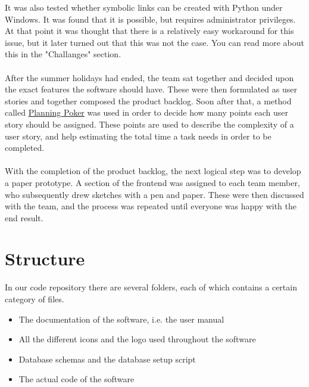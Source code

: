 It was also tested whether symbolic links can be created with Python under Windows. It was found that it is possible, but requires administrator privileges. At that point it was thought that there is a relatively easy workaround for this issue, but it later turned out that this was not the case. You can read more about this in the "Challanges" section. %

\paragraph{}
After the summer holidays had ended, the team sat together and decided upon the exact features the software should have. These were then formulated as user stories and together composed the product backlog. Soon after that, a method called \href{https://en.wikipedia.org/wiki/Planning_poker}{Planning Poker} was used in order to decide how many points each user story should be assigned. These points are used to describe the complexity of a user story, and help estimating the total time a task needs in order to be completed.

\paragraph{}
With the completion of the product backlog, the next logical step was to develop a paper prototype. A section of the frontend was assigned to each team member, who subsequently drew sketches with a pen and paper. These were then discussed with the team, and the process was repeated until everyone was happy with the end result.




\section{Structure}
\def \kapitelautor {Clemens Stadlbauer} 

In our code repository there are several folders, each of which contains a
certain category of files.

\begin{itemize}
	\item[\tfpath{doc/}] The documentation of the software, i.e. the user manual
	\item[\tfpath{icons/}] All the different icons and the logo used throughout the
	software
	\item[\tfpath{db/}] Database schemas and the database setup script
	\item[\tfpath{src/}] The actual code of the software
\end{itemize}

